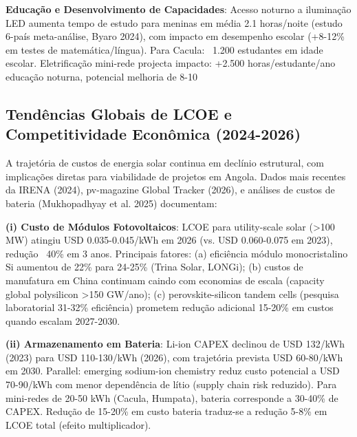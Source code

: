 \documentclass[12pt, a4paper]{article}
\begin{document}
\textbf{Educação e Desenvolvimento de Capacidades}: Acesso noturno a iluminação LED aumenta tempo de estudo para meninas em média 2.1 horas/noite (estudo 6-país meta-análise, Byaro 2024), com impacto em desempenho escolar (+8-12\% em testes de matemática/língua). Para Cacula: ~1.200 estudantes em idade escolar. Eletrificação mini-rede projecta impacto: +2.500 horas/estudante/ano educação noturna, potencial melhoria de 8-10%

\subsection{Tendências Globais de LCOE e Competitividade Econômica (2024-2026)}

A trajetória de custos de energia solar continua em declínio estrutural, com implicações diretas para viabilidade de projetos em Angola. Dados mais recentes da IRENA (2024), pv-magazine Global Tracker (2026), e análises de custos de bateria (Mukhopadhyay et al. 2025) documentam:

\textbf{(i) Custo de Módulos Fotovoltaicos}: LCOE para utility-scale solar (>100 MW) atingiu USD 0.035-0.045/kWh em 2026 (vs. USD 0.060-0.075 em 2023), redução ~40\% em 3 anos. Principais fatores: (a) eficiência módulo monocristalino Si aumentou de 22\% para 24-25\% (Trina Solar, LONGi); (b) custos de manufatura em China continuam caindo com economias de escala (capacity global polysilicon >150 GW/ano); (c) perovskite-silicon tandem cells (pesquisa laboratorial 31-32\% eficiência) prometem redução adicional 15-20\% em custos quando escalam 2027-2030.

\textbf{(ii) Armazenamento em Bateria}: Li-ion CAPEX declinou de USD 132/kWh (2023) para USD 110-130/kWh (2026), com trajetória prevista USD 60-80/kWh em 2030. Parallel: emerging sodium-ion chemistry reduz custo potencial a USD 70-90/kWh com menor dependência de lítio (supply chain risk reduzido). Para mini-redes de 20-50 kWh (Cacula, Humpata), bateria corresponde a 30-40\% de CAPEX. Redução de 15-20\% em custo bateria traduz-se a redução 5-8\% em LCOE total (efeito multiplicador).
\end{document}
